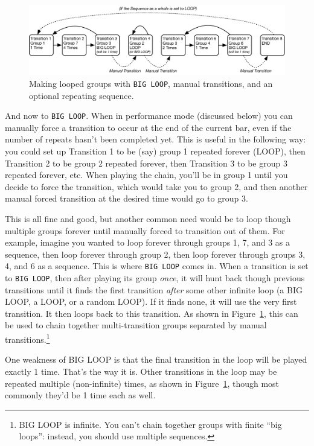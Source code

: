 \documentclass{article}
\begin{document}
\begin{figure}[t]
\centering\includegraphics[width=6.5in]{BigLoop}
\caption{Making looped groups with {\tt BIG LOOP}, manual transitions, and an optional repeating sequence.}
\label{bigloop}
\end{figure}

And now to {\tt BIG LOOP}.  When in performance mode (discussed below) you can manually force a transition to occur at the end of the current bar, even if the number of repeats hasn't been completed yet.  This is useful in the following way: you could set up Transition 1 to be (say) group 1 repeated forever (LOOP), then Transition 2 to be group 2 repeated forever, then Transition 3 to be group 3 repeated forever, etc.  When playing the chain, you'll be in group 1 until you decide to force the transition, which would take you to group 2, and then another manual forced transition at the desired time would go to group 3.

This is all fine and good, but another common need would be to loop though multiple groups forever until manually forced to transition out of them.  For example, imagine you wanted to loop forever through groups 1, 7, and 3 as a sequence, then loop forever through group 2, then loop forever through groups 3, 4, and 6 as a sequence.  This is where {\tt BIG LOOP} comes in.  When a transition is set to {\tt BIG LOOP}, then after playing its group {\it once}, it will hunt back though previous transitions until it finds the first transition {\it after} some other infinite loop (a BIG LOOP, a LOOP, or a random LOOP).  If it finds none, it will use the very first transition.  It then loops back to this transition.  As shown in Figure~\ref{bigloop}, this can be used to chain together multi-transition groups separated by manual transitions.\footnote{BIG LOOP is infinite.  You can't chain together groups with finite ``big loops'': instead, you should use multiple sequences.}

One weakness of BIG LOOP is that the final transition in the loop will be played exactly 1 time.  That's the way it is.  Other transitions in the loop may be repeated multiple (non-infinite) times, as shown in Figure~\ref{bigloop}, though most commonly they'd be 1 time each as well.
\end{document}
